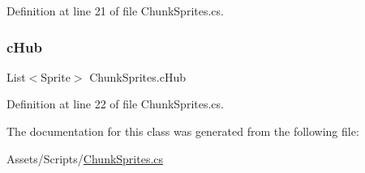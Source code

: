 Definition at line 21 of file Chunk\+Sprites.\+cs.

\mbox{\label{class_chunk_sprites_ad3790f456c356fe27f3da510f399f6a9}} 
\subsubsection{\texorpdfstring{cHub}{cHub}}
{\footnotesize\ttfamily List$<$Sprite$>$ Chunk\+Sprites.\+c\+Hub}



Definition at line 22 of file Chunk\+Sprites.\+cs.



The documentation for this class was generated from the following file\+:\begin{DoxyCompactItemize}
\item 
Assets/\+Scripts/\mbox{\hyperlink{_chunk_sprites_8cs}{Chunk\+Sprites.\+cs}}\end{DoxyCompactItemize}
